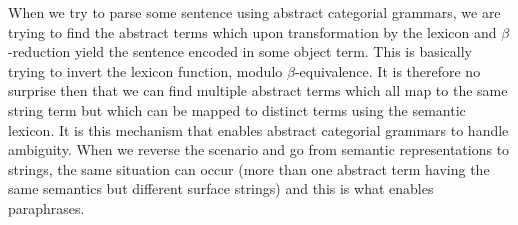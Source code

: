 When we try to parse some sentence using abstract categorial grammars,
we are trying to find the abstract terms which upon transformation by
the lexicon and $\beta$-reduction yield the sentence encoded in some
object term. This is basically trying to invert the lexicon function,
modulo $\beta$-equivalence. It is therefore no surprise then that we can
find multiple abstract terms which all map to the same string term but
which can be mapped to distinct terms using the semantic lexicon. It is
this mechanism that enables abstract categorial grammars to handle
ambiguity. When we reverse the scenario and go from semantic
representations to strings, the same situation can occur (more than one
abstract term having the same semantics but different surface strings)
and this is what enables paraphrases.
